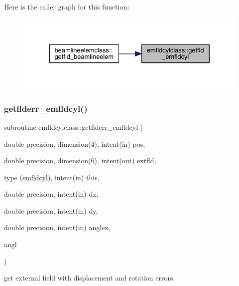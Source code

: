Here is the caller graph for this function\+:\nopagebreak
\begin{figure}[H]
\begin{center}
\leavevmode
\includegraphics[width=330pt]{namespaceemfldcylclass_a521fd72bfe439ce6611678e767ee9263_icgraph}
\end{center}
\end{figure}
\mbox{\label{namespaceemfldcylclass_a2527e326fcd93dd1a661712a4c591de1}} 
\subsubsection{\texorpdfstring{getflderr\_emfldcyl()}{getflderr\_emfldcyl()}}
{\footnotesize\ttfamily subroutine emfldcylclass\+::getflderr\+\_\+emfldcyl (\begin{DoxyParamCaption}\item[{double precision, dimension(4), intent(in)}]{pos,  }\item[{double precision, dimension(6), intent(out)}]{extfld,  }\item[{type (\mbox{\hyperlink{namespaceemfldcylclass_structemfldcylclass_1_1emfldcyl}{emfldcyl}}), intent(in)}]{this,  }\item[{double precision, intent(in)}]{dx,  }\item[{double precision, intent(in)}]{dy,  }\item[{double precision, intent(in)}]{anglex,  }\item[{}]{angl }\end{DoxyParamCaption})}



get external field with displacement and rotation errors. 

